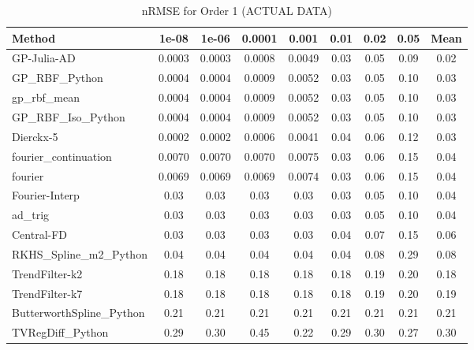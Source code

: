 \begin{table}[htbp]
\centering
\caption{nRMSE for Order 1 (ACTUAL DATA)}
\label{tab:order_1}
\tiny
\begin{tabular}{lcccccccc}
\toprule
\textbf{Method} & \textbf{1e-08} & \textbf{1e-06} & \textbf{0.0001} & \textbf{0.001} & \textbf{0.01} & \textbf{0.02} & \textbf{0.05} & \textbf{Mean} \\
\midrule
GP-Julia-AD & 0.0003 & 0.0003 & 0.0008 & 0.0049 & 0.03 & 0.05 & 0.09 & 0.02 \\
GP_RBF_Python & 0.0004 & 0.0004 & 0.0009 & 0.0052 & 0.03 & 0.05 & 0.10 & 0.03 \\
gp_rbf_mean & 0.0004 & 0.0004 & 0.0009 & 0.0052 & 0.03 & 0.05 & 0.10 & 0.03 \\
GP_RBF_Iso_Python & 0.0004 & 0.0004 & 0.0009 & 0.0052 & 0.03 & 0.05 & 0.10 & 0.03 \\
Dierckx-5 & 0.0002 & 0.0002 & 0.0006 & 0.0041 & 0.04 & 0.06 & 0.12 & 0.03 \\
fourier_continuation & 0.0070 & 0.0070 & 0.0070 & 0.0075 & 0.03 & 0.06 & 0.15 & 0.04 \\
fourier & 0.0069 & 0.0069 & 0.0069 & 0.0074 & 0.03 & 0.06 & 0.15 & 0.04 \\
Fourier-Interp & 0.03 & 0.03 & 0.03 & 0.03 & 0.03 & 0.05 & 0.10 & 0.04 \\
ad_trig & 0.03 & 0.03 & 0.03 & 0.03 & 0.03 & 0.05 & 0.10 & 0.04 \\
Central-FD & 0.03 & 0.03 & 0.03 & 0.03 & 0.04 & 0.07 & 0.15 & 0.06 \\
RKHS_Spline_m2_Python & 0.04 & 0.04 & 0.04 & 0.04 & 0.04 & 0.08 & 0.29 & 0.08 \\
TrendFilter-k2 & 0.18 & 0.18 & 0.18 & 0.18 & 0.18 & 0.19 & 0.20 & 0.18 \\
TrendFilter-k7 & 0.18 & 0.18 & 0.18 & 0.18 & 0.18 & 0.19 & 0.20 & 0.19 \\
ButterworthSpline_Python & 0.21 & 0.21 & 0.21 & 0.21 & 0.21 & 0.21 & 0.21 & 0.21 \\
TVRegDiff_Python & 0.29 & 0.30 & 0.45 & 0.22 & 0.29 & 0.30 & 0.27 & 0.30 \\
\bottomrule
\end{tabular}
\end{table}
